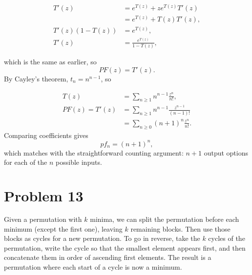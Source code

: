 \documentclass{article}
\newcommand{\problem}[1]{\section*{Problem #1}}
\begin{document}
\begin{align*}
    T'(z) &= e^{T(z)} + ze^{T(z)}T'(z) \\
    &= e^{T(z)} + T(z)T'(z), \\
    T'(z)(1 - T(z)) &= e^{T(z)}, \\
    T'(z) &= \frac{e^{T(z)}}{1 - T(z)},
\end{align*}

which is the same as earlier, so
\[
    PF(z) = T'(z).
\]
By Cayley's theorem, $t_n = n^{n - 1}$, so

\begin{align*}
    T(z) &= \sum_{n \ge 1} n^{n - 1} \frac{z^n}{n!}, \\
    PF(z) = T'(z) &= \sum_{n \ge 1} n^{n - 1} \frac{z^{n - 1}}{(n - 1)!} \\
    &= \sum_{n \ge 0} (n + 1)^n \frac{z^n}{n!}.
\end{align*}
Comparing coefficients gives
\[
    pf_n = (n + 1)^n,
\]
which matches with the straightforward counting argument: $n + 1$ output options for each of the $n$ possible inputs.

\problem{13}
Given a permutation with $k$ minima, we can split the permutation before each minimum (except the first one), leaving $k$ remaining blocks. Then use those blocks as cycles for a new permutation. To go in reverse, take the $k$ cycles of the permutation, write the cycle so that the smallest element appears first, and then concatenate them in order of ascending first elements. The result is a permutation where each start of a cycle is now a minimum.
\end{document}
